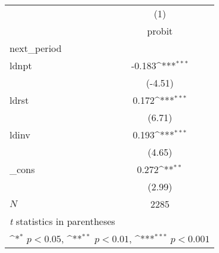 {
\def\sym#1{\ifmmode^{#1}\else\(^{#1}\)\fi}
\begin{tabular}{l*{1}{c}}
\hline\hline
            &\multicolumn{1}{c}{(1)}\\
            &\multicolumn{1}{c}{probit}\\
\hline
next\_period &                     \\
ldnpt       &      -0.183\sym{***}\\
            &     (-4.51)         \\
[1em]
ldrst       &       0.172\sym{***}\\
            &      (6.71)         \\
[1em]
ldinv       &       0.193\sym{***}\\
            &      (4.65)         \\
[1em]
\_cons      &       0.272\sym{**} \\
            &      (2.99)         \\
\hline
\(N\)       &        2285         \\
\hline\hline
\multicolumn{2}{l}{\footnotesize \textit{t} statistics in parentheses}\\
\multicolumn{2}{l}{\footnotesize \sym{*} \(p<0.05\), \sym{**} \(p<0.01\), \sym{***} \(p<0.001\)}\\
\end{tabular}
}
